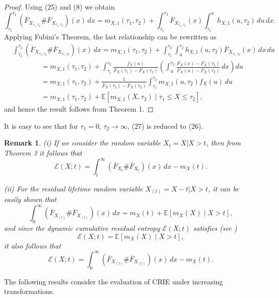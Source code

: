 \documentclass[11pt]{article}
\newtheorem{remark}{Remark}
\begin{document}
\begin{proof}
	Using (25) and (8) we obtain
	$$ \textstyle \int_{\tau_1}^{\tau_2} (\overline{F}_{X_{\tau_1,\tau_2}}\# \overline{F}_{X_{\tau_1,\tau_2}})(x)\,dx = m_{X,1}(\tau_1,\tau_2)+\int_{\tau_1}^{\tau_2} \overline{F}_{X_{\tau_1,\tau_2}}(x) \int_{\tau_1}^x h_{X,1}(u,\tau_2)\,du\,dx. $$
	Applying Fubini’s Theorem, the last relationship can be rewritten as
	\begin{align*}
		& \textstyle \int_{\tau_1}^{\tau_2} (\overline{F}_{X_{\tau_1,\tau_2}}\# \overline{F}_{X_{\tau_1,\tau_2}})(x)\,dx = m_{X,1}(\tau_1,\tau_2) + \int_{\tau_1}^{\tau_2} \int_u^{\tau_2} h_{X,1}(u,\tau_2) \overline{F}_{X_{\tau_1,\tau_2}}(x)\,dx\,du \\
		& \textstyle \qquad \qquad = m_{X,1}(\tau_1,\tau_2) + \int_{\tau_1}^{\tau_2} \frac{f_X(u)}{\overline{F}_X(\tau_1)-\overline{F}_X(\tau_2)} \left(\int_u^{\tau_2} \frac{\overline{F}_X(x)-\overline{F}_X(\tau_2)}{\overline{F}_X(u)-\overline{F}_X(\tau_2)}\,dx\right) du \\
		& \textstyle \qquad \qquad = m_{X,1}(\tau_1,\tau_2) + \frac{1}{\overline{F}_X(\tau_1)-\overline{F}_X(\tau_2)} \int_{\tau_1}^{\tau_2} m_{X,1}(u,\tau_2) f_X(u)\,du \\
		& \textstyle \qquad \qquad = m_{X,1}(\tau_1,\tau_2) + \mathbb{E}[m_{X,1}(X,\tau_2) \mid \tau_1 \leq X\leq \tau_2],
	\end{align*}
	and hence the result follows from Theorem 1.
\end{proof}
It is easy to see that for $\tau_1=0$, $\tau_2\to\infty$, (27) is reduced to (26).

 
\begin{remark} 
	(i) If we consider the random variable $X_{t}=X|X>t$, then from Theorem 3 it follows that
	$$ \textstyle \mathcal{E}(X;t)=\int_t^\infty (\overline{F}_{X_{t}}\# \overline{F}_{X_{t}})(x)\,dx - m_X(t). $$
	
	\noindent (ii) For the residual lifetime random variable $X_{(t)} = X - t | X > t$, it can be easily shown that
	$$ \textstyle \int_0^\infty (\overline{F}_{X_{(t)}}\# \overline{F}_{X_{(t)}})(x)\,dx = m_X(t) + \mathbb{E}[m_X(X) \mid X > t], $$
	and since the dynamic cumulative residual entropy $\mathcal{E}(X;t)$ satisfies (see \cite{Asadi2007})
	$$\mathcal{E}(X;t)=\mathbb{E}[m_X(X) \mid X > t],$$
	it also follows that
	$$ \textstyle \mathcal{E}(X;t)=\int_0^\infty (\overline{F}_{X_{(t)}}\# \overline{F}_{X_{(t)}})(x)\,dx - m_X(t). $$
\end{remark}

The following results consider the evaluation of CRIE under increasing transformations.
 
\end{document}

